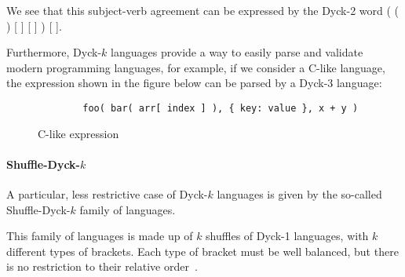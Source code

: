 We see that this subject-verb agreement can be expressed by the Dyck-2 word \textcolor[rgb]{0.29,0.56,0.89}{( ( ) [ ] [ ] ) [ ]}.

Furthermore, Dyck-$k$ languages provide a way to easily parse and validate modern programming languages, for example, if we consider a C-like language, the expression shown in the figure below can be parsed by a Dyck-3 language:

\begin{figure}[h]
    \centering
    \begin{verbatim}
        foo( bar( arr[ index ] ), { key: value }, x + y )
    \end{verbatim}
    \caption{C-like expression}
    \label{fig:c-like-code}
\end{figure}

\paragraph{Shuffle-Dyck-$k$} \label{par:shuffle-dyck-k}

A particular, less restrictive case of Dyck-$k$ languages is given by the so-called Shuffle-Dyck-$k$ family of languages.

This family of languages is made up of $k$ shuffles of Dyck-1 languages, with $k$ different types of brackets. Each type of bracket must be well balanced, but there is no restriction to their relative order~\cite{bhattamistra-transformers-formal-languages}.